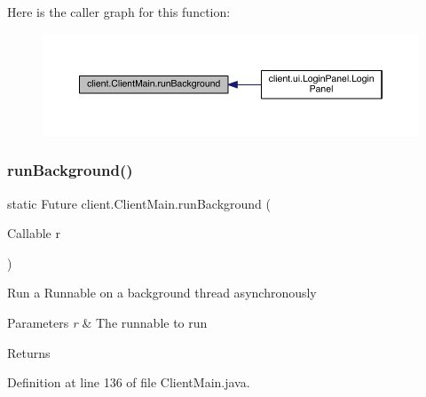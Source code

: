 Here is the caller graph for this function\+:
\nopagebreak
\begin{figure}[H]
\begin{center}
\leavevmode
\includegraphics[width=350pt]{classclient_1_1_client_main_afb84263c3e741a3f35611ef1b28b838e_icgraph}
\end{center}
\end{figure}
\hypertarget{classclient_1_1_client_main_a0b66d467ed48a17869c86a90992937cc}{}\label{classclient_1_1_client_main_a0b66d467ed48a17869c86a90992937cc} 
\subsubsection{\texorpdfstring{run\+Background()}{runBackground()}\hspace{0.1cm}{\footnotesize\ttfamily [2/2]}}
{\footnotesize\ttfamily static Future client.\+Client\+Main.\+run\+Background (\begin{DoxyParamCaption}\item[{Callable}]{r }\end{DoxyParamCaption})\hspace{0.3cm}{\ttfamily [static]}}

Run a Runnable on a background thread asynchronously


\begin{DoxyParams}{Parameters}
{\em r} & The runnable to run \\
\hline
\end{DoxyParams}
\begin{DoxyReturn}{Returns}

\end{DoxyReturn}


Definition at line 136 of file Client\+Main.\+java.

\hypertarget{classclient_1_1_client_main_ad1c0bf16363beb967cc1a7a9a41a4e21}{}\label{classclient_1_1_client_main_ad1c0bf16363beb967cc1a7a9a41a4e21} 
